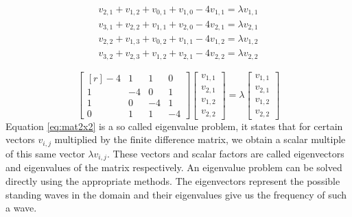 \documentclass[a4paper]{article}
\begin{document}
\begin{equation}
\begin{aligned}
v_{2,1} + v_{1,2} + v_{0,1} + v_{1,0} - 4v_{1,1} =  \lambda v_{1,1} \\
v_{3,1} + v_{2,2} + v_{1,1} + v_{2,0} - 4v_{2,1} =  \lambda v_{2,1} \\
v_{2,2} + v_{1,3} + v_{0,2} + v_{1,1} - 4v_{1,2} =  \lambda v_{1,2}\\
v_{3,2} + v_{2,3} + v_{1,2} + v_{2,1} - 4v_{2,2} =  \lambda v_{2,2}
\end{aligned}
\label{eq:waveDiscrExpl}
\end{equation}



\begin{equation}
\begin{bmatrix*}[r]
    -4 & 1 & 1 & 0 \\
    1 & -4 & 0 & 1 \\
    1 & 0 & -4 & 1 \\
    0 & 1 & 1 & -4
\end{bmatrix*}
\begin{bmatrix*}
    v_{1,1}\\
    v_{2,1}\\
    v_{1,2}\\
    v_{2,2}
\end{bmatrix*}
=
\lambda
\begin{bmatrix*}
     v_{1,1}\\
    v_{2,1}\\
    v_{1,2}\\
    v_{2,2}
\end{bmatrix*}
\label{eq:mat2x2}
\end{equation}
Equation \ref{eq:mat2x2} is a so called eigenvalue problem, it states that for certain vectors $v_{i,j}$ multiplied by the finite difference matrix, we obtain a scalar multiple of this same vector $\lambda v_{i,j}$. These vectors and scalar factors are called eigenvectors and eigenvalues of the matrix respectively. An eigenvalue problem can be solved directly using the appropriate methods. The eigenvectors represent the possible standing waves in the domain and their eigenvalues give us the frequency of such a wave. 
 
\end{document}
